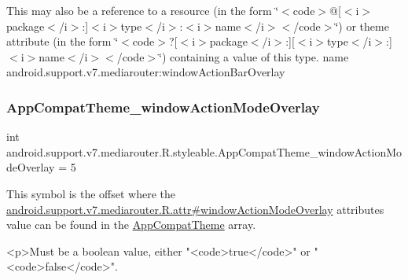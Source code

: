 This may also be a reference to a resource (in the form \char`\"{}$<$code$>$@\mbox{[}$<$i$>$package$<$/i$>$\+:\mbox{]}$<$i$>$type$<$/i$>$\+:$<$i$>$name$<$/i$>$$<$/code$>$\char`\"{}) or theme attribute (in the form \char`\"{}$<$code$>$?\mbox{[}$<$i$>$package$<$/i$>$\+:\mbox{]}\mbox{[}$<$i$>$type$<$/i$>$\+:\mbox{]}$<$i$>$name$<$/i$>$$<$/code$>$\char`\"{}) containing a value of this type.  name android.\+support.\+v7.\+mediarouter\+:window\+Action\+Bar\+Overlay \mbox{\label{classandroid_1_1support_1_1v7_1_1mediarouter_1_1R_1_1styleable_ae55a9de1cb75512d04d62f878dcfefc3}} 
\subsubsection{\texorpdfstring{App\+Compat\+Theme\+\_\+window\+Action\+Mode\+Overlay}{AppCompatTheme\_windowActionModeOverlay}}
{\footnotesize\ttfamily int android.\+support.\+v7.\+mediarouter.\+R.\+styleable.\+App\+Compat\+Theme\+\_\+window\+Action\+Mode\+Overlay = 5\hspace{0.3cm}{\ttfamily [static]}}

This symbol is the offset where the \hyperlink{classandroid_1_1support_1_1v7_1_1mediarouter_1_1R_1_1attr_ab789e70260e203465110433076413756}{android.\+support.\+v7.\+mediarouter.\+R.\+attr\#window\+Action\+Mode\+Overlay} attribute\textquotesingle{}s value can be found in the \hyperlink{classandroid_1_1support_1_1v7_1_1mediarouter_1_1R_1_1styleable_a4e3d3900c75d49aeb2f283cac00214d6}{App\+Compat\+Theme} array.

\begin{DoxyVerb}      <p>Must be a boolean value, either "<code>true</code>" or "<code>false</code>".
\end{DoxyVerb}
 

